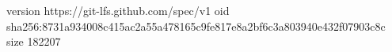 version https://git-lfs.github.com/spec/v1
oid sha256:8731a934008c415ac2a55a478165c9fe817e8a2bf6c3a803940e432f07903c8c
size 182207
